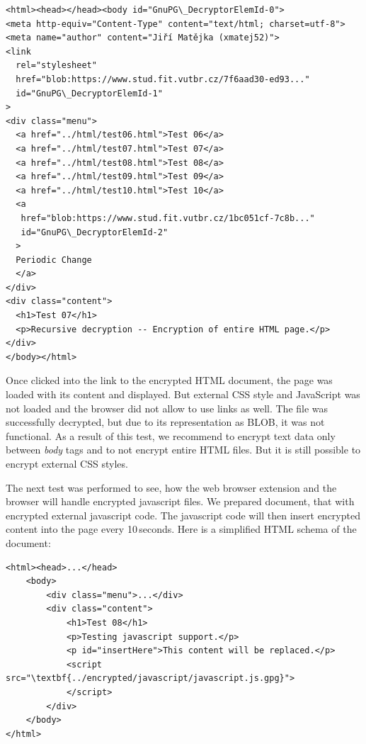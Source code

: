 \begin{Verbatim}[commandchars=\\\{\},codes={\catcode`$=3\catcode`_=8},samepage=false,frame=single]
<html><head></head><body id="GnuPG\_DecryptorElemId-0">
<meta http-equiv="Content-Type" content="text/html; charset=utf-8">
<meta name="author" content="Jiří Matějka (xmatej52)">
<link
  rel="stylesheet"
  href="blob:https://www.stud.fit.vutbr.cz/7f6aad30-ed93..."
  id="GnuPG\_DecryptorElemId-1"
>
<div class="menu">
  <a href="../html/test06.html">Test 06</a>
  <a href="../html/test07.html">Test 07</a>
  <a href="../html/test08.html">Test 08</a>
  <a href="../html/test09.html">Test 09</a>
  <a href="../html/test10.html">Test 10</a>
  <a
   href="blob:https://www.stud.fit.vutbr.cz/1bc051cf-7c8b..."
   id="GnuPG\_DecryptorElemId-2"
  >
  Periodic Change
  </a>
</div>
<div class="content">
  <h1>Test 07</h1>
  <p>Recursive decryption -- Encryption of entire HTML page.</p>
</div>
</body></html>
\end{Verbatim}

Once clicked into the link to the encrypted HTML document, the page was loaded with its content and displayed. But external CSS style and JavaScript was not loaded and the browser did not allow to use links as well. The file was successfully decrypted, but due to its representation as BLOB, it was not functional. As a result of this test, we recommend to encrypt text data only between \textit{body} tags and to not encrypt entire HTML files. But it is still possible to encrypt external CSS styles.

The next test was performed to see, how the web browser extension and the browser will handle encrypted javascript files. We prepared document, that with encrypted external javascript code. The javascript code will then insert encrypted content into the page every 10\,seconds. Here is a simplified HTML schema of the document:

\begin{Verbatim}[commandchars=\\\{\},codes={\catcode`$=3\catcode`_=8},samepage=false,frame=single]
<html><head>...</head>
    <body>
        <div class="menu">...</div>
        <div class="content">
            <h1>Test 08</h1>
            <p>Testing javascript support.</p>
            <p id="insertHere">This content will be replaced.</p>
            <script src="\textbf{../encrypted/javascript/javascript.js.gpg}">
            </script>
        </div>
    </body>
</html>
\end{Verbatim}

